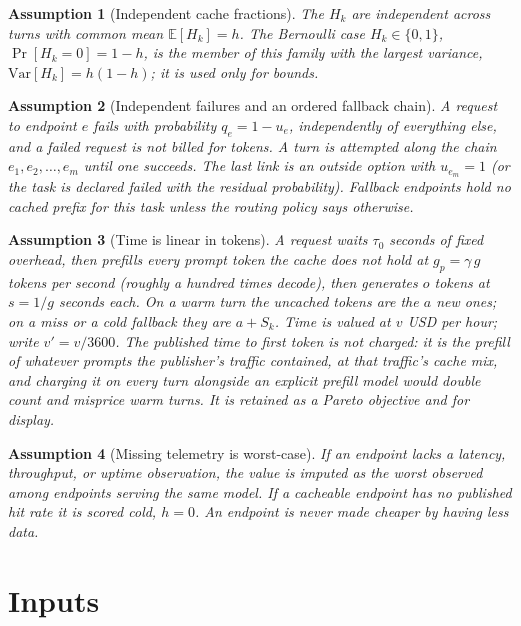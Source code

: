 \documentclass[11pt]{article}
\newtheorem{assumption}{Assumption}
\newcommand{\E}{\mathbb{E}}
\newcommand{\Var}{\mathrm{Var}}
\newcommand{\Prob}{\Pr}
\begin{document}
\begin{assumption}[Independent cache fractions]\label{as:indep}
The $H_k$ are independent across turns with common mean $\E[H_k] = h$. The
Bernoulli case $H_k \in \{0,1\}$, $\Prob[H_k = 0] = 1 - h$, is the member of this
family with the largest variance, $\Var[H_k] = h(1-h)$; it is used only for
bounds.
\end{assumption}

\begin{assumption}[Independent failures and an ordered fallback chain]\label{as:fail}
A request to endpoint $e$ fails with probability $q_e = 1 - u_e$,
independently of everything else, and a failed request is not billed for
tokens. A turn is attempted along the chain $e_1, e_2, \dots, e_m$ until one
succeeds. The last link is an outside option with $u_{e_m} = 1$ (or the task
is declared failed with the residual probability). Fallback endpoints hold no
cached prefix for this task unless the routing policy says otherwise.
\end{assumption}

\begin{assumption}[Time is linear in tokens]\label{as:time}
A request waits $\tau_0$ seconds of fixed overhead, then prefills every prompt
token the cache does not hold at $g_p = \gamma\, g$ tokens per second (roughly
a hundred times decode), then generates $o$ tokens at $s = 1/g$ seconds each.
On a warm turn the uncached tokens are the $a$ new ones; on a miss or a cold
fallback they are $a + S_k$. Time is valued at $v$ USD per hour; write
$v' = v / 3600$. The published time to first token is \emph{not} charged: it
is the prefill of whatever prompts the publisher's traffic contained, at that
traffic's cache mix, and charging it on every turn alongside an explicit
prefill model would double count and misprice warm turns. It is retained as a
Pareto objective and for display.
\end{assumption}

\begin{assumption}[Missing telemetry is worst-case]\label{as:missing}
If an endpoint lacks a latency, throughput, or uptime observation, the value is
imputed as the worst observed among endpoints serving the same model. If a
cacheable endpoint has no published hit rate it is scored cold, $h = 0$. An
endpoint is never made cheaper by having less data.
\end{assumption}

\section{Inputs}\label{sec:inputs}
\end{document}
